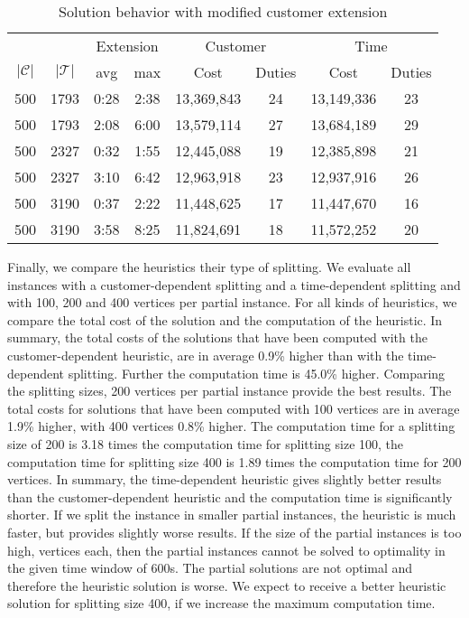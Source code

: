 \begin{table}[htb]
	\centering
	\begin{tabular}{cccccccc}
		\toprule
		&& \multicolumn{2}{c}{Extension} & \multicolumn{2}{c}{Customer} & \multicolumn{2}{c}{Time} \\
		\cmidrule(r){3-8}
		$\vert\mathcal{C}\vert$ & $\vert\mathcal{T}\vert$ & avg & max & Cost & Duties & Cost & Duties \\
		\midrule
		500 & 1793 & 0:28 & 2:38 & 13,369,843 & 24 & 13,149,336 & 23 \\
		500 & 1793 & 2:08 & 6:00 & 13,579,114 & 27 & 13,684,189 & 29 \\
		500 & 2327 & 0:32 & 1:55 & 12,445,088 & 19 & 12,385,898 & 21 \\
		500 & 2327 & 3:10 & 6:42 & 12,963,918 & 23 & 12,937,916 & 26 \\
		500 & 3190 & 0:37 & 2:22 & 11,448,625 & 17 & 11,447,670 & 16 \\
		500 & 3190 & 3:58 & 8:25 & 11,824,691 & 18 & 11,572,252 & 20 \\
		\bottomrule
	\end{tabular}
	\caption{Solution behavior with modified customer extension}
	\label{tab:results:extension}
\end{table}

Finally, we compare the heuristics \wrt their type of splitting. We evaluate all instances with a customer-dependent splitting and a time-dependent splitting and with 100, 200 and 400 vertices per partial instance. For all kinds of heuristics, we compare the total cost of the solution and the computation of the heuristic. In summary, the total costs of the solutions that have been computed with the customer-dependent heuristic, are in average 0.9\% higher than with the time-dependent splitting. Further the computation time is 45.0\% higher. Comparing the splitting sizes, 200 vertices per partial instance provide the best results. The total costs for solutions that have been computed with 100 vertices are in average 1.9\% higher, with 400 vertices 0.8\% higher. The computation time for a splitting size of 200 is 3.18 times the computation time for splitting size 100, the computation time for splitting size 400 is 1.89 times the computation time for 200 vertices. In summary, the time-dependent heuristic gives slightly better results than the customer-dependent heuristic and the computation time is significantly shorter. If we split the instance in smaller partial instances, the heuristic is much faster, but provides slightly worse results. If the size of the partial instances is too high,  vertices each, then the partial instances cannot be solved to optimality in the given time window of 600s. The partial solutions are not optimal and therefore the heuristic solution is worse. We expect to receive a better heuristic solution for splitting size 400, if we increase the maximum computation time. 

